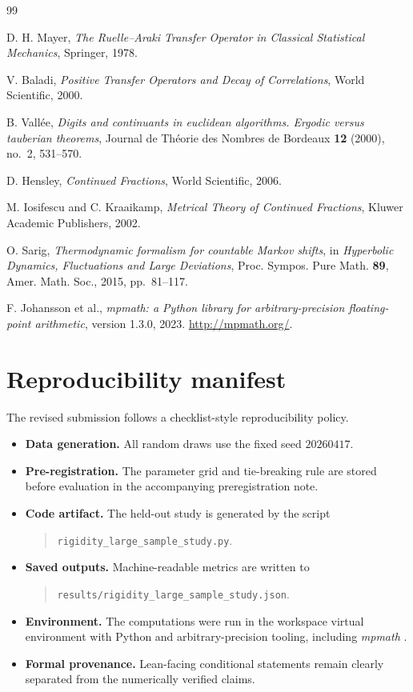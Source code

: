 \documentclass[11pt]{article}
\begin{document}
\begin{thebibliography}{99}

D. H. Mayer,
\emph{The Ruelle--Araki Transfer Operator in Classical Statistical Mechanics},
Springer, 1978.

V. Baladi,
\emph{Positive Transfer Operators and Decay of Correlations},
World Scientific, 2000.

B. Vall\'ee,
\emph{Digits and continuants in euclidean algorithms. Ergodic versus tauberian theorems},
Journal de Th\'eorie des Nombres de Bordeaux \textbf{12} (2000), no.~2, 531--570.

D. Hensley,
\emph{Continued Fractions},
World Scientific, 2006.

M. Iosifescu and C. Kraaikamp,
\emph{Metrical Theory of Continued Fractions},
Kluwer Academic Publishers, 2002.

O. Sarig,
\emph{Thermodynamic formalism for countable Markov shifts},
in \emph{Hyperbolic Dynamics, Fluctuations and Large Deviations},
Proc. Sympos. Pure Math. \textbf{89}, Amer. Math. Soc., 2015, pp.~81--117.

F. Johansson et al.,
\emph{mpmath: a Python library for arbitrary-precision floating-point arithmetic},
version 1.3.0, 2023. \url{http://mpmath.org/}.

\end{thebibliography}

\appendix
\section{Reproducibility manifest}

The revised submission follows a checklist-style reproducibility policy.

\begin{itemize}
    \item \textbf{Data generation.} All random draws use the fixed seed $20260417$.
    \item \textbf{Pre-registration.} The parameter grid and tie-breaking rule are stored before evaluation in the accompanying preregistration note.
    \item \textbf{Code artifact.} The held-out study is generated by the script
    \begin{quote}
    \texttt{rigidity\_large\_sample\_study.py}.
    \end{quote}
    \item \textbf{Saved outputs.} Machine-readable metrics are written to
    \begin{quote}
    \texttt{results/rigidity\_large\_sample\_study.json}.
    \end{quote}
    \item \textbf{Environment.} The computations were run in the workspace virtual environment with Python and arbitrary-precision tooling, including \emph{mpmath} \cite{mpmath}.
    \item \textbf{Formal provenance.} Lean-facing conditional statements remain clearly separated from the numerically verified claims.
\end{itemize}
\end{document}
